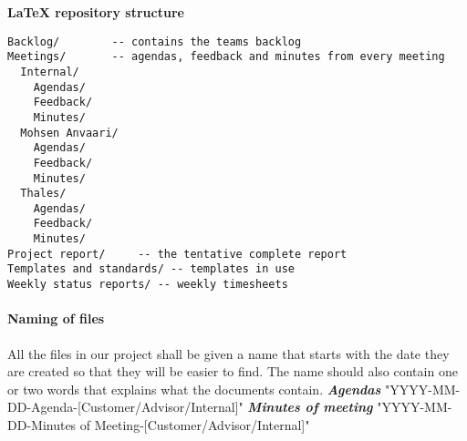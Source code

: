 \newpage

\textbf{LaTeX repository structure}
\begin{verbatim}
Backlog/		-- contains the teams backlog
Meetings/		-- agendas, feedback and minutes from every meeting
  Internal/
    Agendas/
    Feedback/
    Minutes/
  Mohsen Anvaari/
    Agendas/
    Feedback/
    Minutes/
  Thales/
    Agendas/
    Feedback/
    Minutes/
Project report/		-- the tentative complete report
Templates and standards/ -- templates in use
Weekly status reports/ -- weekly timesheets
\end{verbatim}

\paragraph{Naming of files}\hfill
\newline
All the files in our project shall be given a name that starts with the date they are created so that they will be easier to find. The name should also contain one or two words that explains what the documents contain.
\newline
\newline
\textit{\textbf{Agendas}}
\newline
"YYYY-MM-DD-Agenda-[Customer/Advisor/Internal]"
\newline
\newline
\textit{\textbf{Minutes of meeting}}
\newline
"YYYY-MM-DD-Minutes of Meeting-[Customer/Advisor/Internal]"



